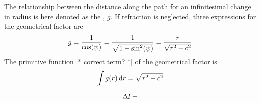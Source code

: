 The relationship between the distance along the path for an
infinitesimal change in radius is here denoted as the
, $g$. If refraction is neglected, three
expressions for the geometrical factor are
\begin{equation}
  g = \frac{1}{\cos(\psi)} = \frac{1}{\sqrt{1-\sin^2(\psi)}}
                                            = \frac{r}{\sqrt{r^2-c^2}}
  \label{eq:ppath:geomfac}
\end{equation}
The primitive function [* correct term? *] of the geometrical factor is
\begin{equation}
  \int{g(\ensuremath{r})}\,\mathrm{d} r = \sqrt{r^2-c^2}
  \label{eq:ppath:geomfac}
\end{equation}


\begin{equation}
  \Delta l = 
  \label{eq:ppath:}
\end{equation}



\label{sec:ppath:1D}


\label{sec:ppath:1Dwithout}


\label{sec:ppath:1Dwith}



\label{sec:ppath:2D}


\label{sec:ppath:2Dwithout}


\label{sec:ppath:2Dwith}



\label{sec:ppath:3D}


\label{sec:ppath:3Dwithout}


\label{sec:ppath:3Dwith}



\label{sec:ppath:cfile}





